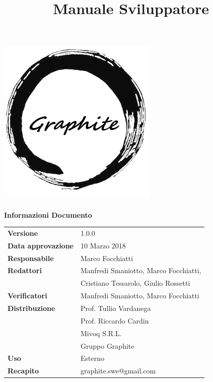 \documentclass[openany,12pt,a4paper]{report}
\title{Manuale Sviluppatore}
\author{}
\newcommand{\versione}{1.0.0}
\begin{document}
	
	\makeatletter
	\begin{titlepage}
		\setlength{\headsep}{0pt}  
		\begin{center}
			\includegraphics[width=0.5\linewidth]{img/logo.png}\\[1em]
			{\huge \bfseries  \@title }\\[10ex]
			\textbf{\Large Informazioni Documento} \\[2em]
			\bgroup
			\def\arraystretch{1.5}
			\begin{tabular}{l|l}
				\textbf{Versione} & \versione{} \\
				\textbf{Data approvazione} & 10 Marzo 2018 \\
				\textbf{Responsabile} & Marco Focchiatti\\
				\textbf{Redattori} &  Manfredi Smaniotto, Marco Focchiatti,\\
				& Cristiano Tessarolo, Giulio Rossetti \\
				\textbf{Verificatori} & Manfredi Smaniotto, Marco Focchiatti \\
				\textbf{Distribuzione} & Prof. Tullio Vardanega \\
				& Prof. Riccardo Cardin \\
				& Mivoq S.R.L. \\
				& Gruppo Graphite \\
				\textbf{Uso} & Esterno \\
				\textbf{Recapito} & graphite.swe@gmail.com \\
			\end{tabular}
			\egroup
		\end{center}
	\end{titlepage}
	\makeatother
	
	\thispagestyle{empty}
	\newpage
	
	
\end{document}
